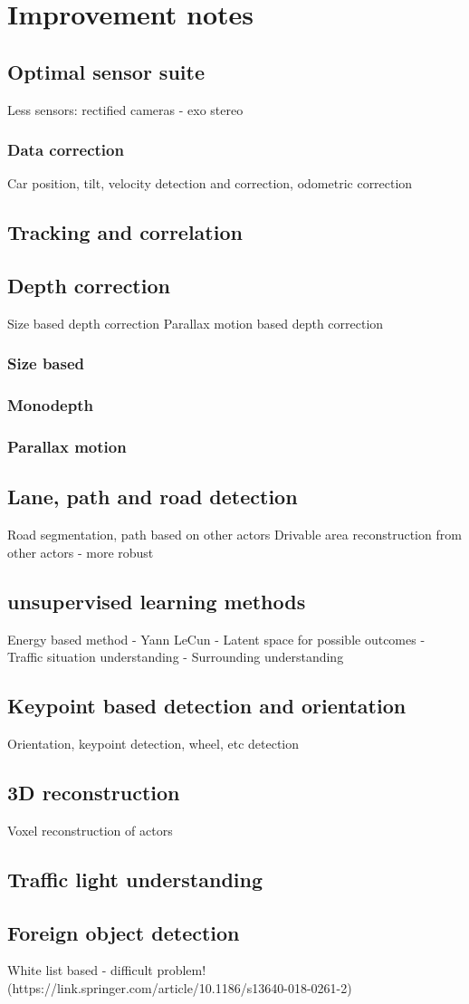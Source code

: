 \chapter{Improvement notes}
\label{chap:improvement}
\section{Optimal sensor suite}
Less sensors: rectified cameras - exo stereo
\subsection{Data correction}
Car position, tilt, velocity detection and correction, odometric correction
\section{Tracking and correlation}
\section{Depth correction}
Size based depth correction
Parallax motion based depth correction
\subsection{Size based}
\subsection{Monodepth}
\subsection{Parallax motion}
\section{Lane, path and road detection}
Road segmentation, path  based on other actors
Drivable area reconstruction from other actors - more robust
\section{unsupervised learning methods}
Energy based method - Yann LeCun
  - Latent space for possible outcomes
  - Traffic situation understanding
  - Surrounding understanding
\section{Keypoint based detection and orientation}
Orientation, keypoint detection, wheel, etc detection
\section{3D reconstruction}
Voxel reconstruction of actors
\section{Traffic light understanding}
\section{Foreign object detection}
White list based - difficult problem! (https://link.springer.com/article/10.1186/s13640-018-0261-2)